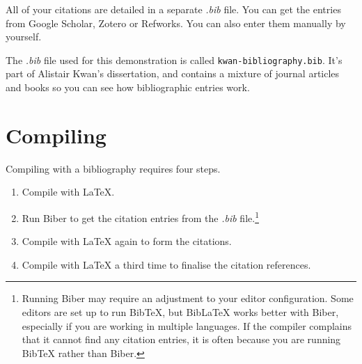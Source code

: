 All of your citations are detailed in a separate \emph{.bib} file. You can get the entries from Google Scholar, Zotero or Refworks.  You can also enter them manually by yourself.

The \emph{.bib} file used for this demonstration is called \texttt{kwan-bibliography.bib}. It's part of Alistair Kwan's dissertation, and contains a mixture of journal articles and books so you can see how bibliographic entries work.




\section{Compiling}
Compiling with a bibliography requires four steps.
\begin{enumerate}
\item Compile with LaTeX.
\item Run Biber to get the citation entries from the \emph{.bib} file.\footnote{Running Biber may require an adjustment to your editor configuration. Some editors are set up to run BibTeX, but BibLaTeX works better with Biber, especially if you are working in multiple languages.  If the compiler complains that it cannot find any citation entries, it is often because you are running BibTeX rather than Biber.}
\item Compile with LaTeX again to form the citations.
\item Compile with LaTeX a third time to finalise the citation references.
\end{enumerate}

